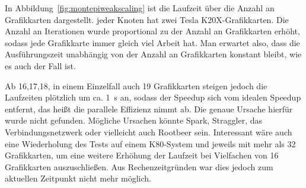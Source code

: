 In Abbildung~\ref{fig:montepiweakscaling} ist die Laufzeit über die Anzahl an Grafikkarten dargestellt. jeder Knoten hat zwei Tesla K20X-Grafikkarten.
Die Anzahl an Iterationen wurde proportional zu der Anzahl an Grafikkarten erhöht, sodass jede Grafikkarte immer gleich viel Arbeit hat.
Man erwartet also, dass die Ausführungszeit unabhängig von der Anzahl an Grafikkarten konstant bleibt, wie es auch der Fall ist.

Ab 16,17,18, in einem Einzelfall auch 19 Grafikkarten steigen jedoch die Laufzeiten plötzlich um ca. \SI{1}{\second} an, sodass der Speedup sich vom idealen Speedup entfernt, das heißt die parallele Effizienz nimmt ab.
Die genaue Ursache hierfür wurde nicht gefunden.
Mögliche Ursachen könnte Spark, Straggler, das Verbindungsnetzwerk oder vielleicht auch Rootbeer sein.
Interessant wäre auch eine Wiederholung des Tests auf einem K80-System und jeweils mit mehr als 32 Grafikkarten, um eine weitere Erhöhung der Laufzeit bei Vielfachen von 16 Grafikkarten auszuschließen.
Aus Rechenzeitgründen war dies jedoch zum aktuellen Zeitpunkt nicht mehr möglich.


